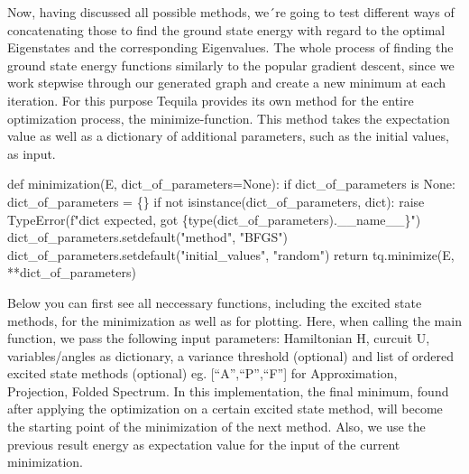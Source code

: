 \documentclass[
  letterpaper,
  DIV=11,
  numbers=noendperiod]{scrartcl}
\newenvironment{Shaded}{\begin{snugshade}}{\end{snugshade}}
\newcommand{\BuiltInTok}[1]{\textcolor[rgb]{0.00,0.23,0.31}{#1}}
\newcommand{\ControlFlowTok}[1]{\textcolor[rgb]{0.00,0.23,0.31}{#1}}
\newcommand{\KeywordTok}[1]{\textcolor[rgb]{0.00,0.23,0.31}{#1}}
\newcommand{\NormalTok}[1]{\textcolor[rgb]{0.00,0.23,0.31}{#1}}
\newcommand{\OperatorTok}[1]{\textcolor[rgb]{0.37,0.37,0.37}{#1}}
\newcommand{\PreprocessorTok}[1]{\textcolor[rgb]{0.68,0.00,0.00}{#1}}
\newcommand{\SpecialCharTok}[1]{\textcolor[rgb]{0.37,0.37,0.37}{#1}}
\newcommand{\SpecialStringTok}[1]{\textcolor[rgb]{0.13,0.47,0.30}{#1}}
\newcommand{\StringTok}[1]{\textcolor[rgb]{0.13,0.47,0.30}{#1}}
\newcommand{\VariableTok}[1]{\textcolor[rgb]{0.07,0.07,0.07}{#1}}
\begin{document}
Now, having discussed all possible methods, we´re going to test
different ways of concatenating those to find the ground state energy
with regard to the optimal Eigenstates and the corresponding
Eigenvalues. The whole process of finding the ground state energy
functions similarly to the popular gradient descent, since we work
stepwise through our generated graph and create a new minimum at each
iteration. For this purpose Tequila provides its own method for the
entire optimization process, the minimize-function. This method takes
the expectation value as well as a dictionary of additional parameters,
such as the initial values, as input.

\begin{Shaded}
\begin{Highlighting}[]
\KeywordTok{def}\NormalTok{ minimization(E, dict\_of\_parameters}\OperatorTok{=}\VariableTok{None}\NormalTok{):}
    \ControlFlowTok{if}\NormalTok{ dict\_of\_parameters }\KeywordTok{is} \VariableTok{None}\NormalTok{:}
\NormalTok{        dict\_of\_parameters }\OperatorTok{=}\NormalTok{ \{\}}
    \ControlFlowTok{if} \KeywordTok{not} \BuiltInTok{isinstance}\NormalTok{(dict\_of\_parameters, }\BuiltInTok{dict}\NormalTok{):}
        \ControlFlowTok{raise} \PreprocessorTok{TypeError}\NormalTok{(}\SpecialStringTok{f"dict expected, got \textquotesingle{}}\SpecialCharTok{\{}\BuiltInTok{type}\NormalTok{(dict\_of\_parameters)}\SpecialCharTok{.}\VariableTok{\_\_name\_\_}\SpecialCharTok{\}}\SpecialStringTok{\textquotesingle{}"}\NormalTok{)}
\NormalTok{    dict\_of\_parameters.setdefault(}\StringTok{"method"}\NormalTok{, }\StringTok{"BFGS"}\NormalTok{)}
\NormalTok{    dict\_of\_parameters.setdefault(}\StringTok{"initial\_values"}\NormalTok{, }\StringTok{"random"}\NormalTok{)}
    \ControlFlowTok{return}\NormalTok{ tq.minimize(E, }\OperatorTok{**}\NormalTok{dict\_of\_parameters)}
\end{Highlighting}
\end{Shaded}

Below you can first see all neccessary functions, including the excited
state methods, for the minimization as well as for plotting. Here, when
calling the main function, we pass the following input parameters:
Hamiltonian H, curcuit U, variables/angles as dictionary, a variance
threshold (optional) and list of ordered excited state methods
(optional) eg. {[}``A'',``P'',``F''{]} for Approximation, Projection,
Folded Spectrum. In this implementation, the final minimum, found after
applying the optimization on a certain excited state method, will become
the starting point of the minimization of the next method. Also, we use
the previous result energy as expectation value for the input of the
current minimization.
\end{document}
